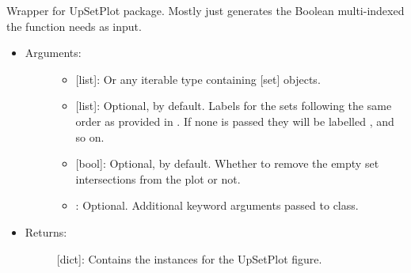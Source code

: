 \documentclass[letterpaper,10pt,english]{sphinxmanual}
\begin{document}
\begin{fulllineitems}
\label{\detokenize{plots:data_tools.plots.upset_wrap}}
Wrapper for UpSetPlot package. Mostly just generates the Boolean
multi-indexed  the  function
needs as input.
\begin{itemize}
\item {} \begin{description}
\item[{Arguments:}] \leavevmode\begin{itemize}
\item {} 
 {[}list{]}: Or any iterable type containing {[}set{]} objects.

\item {} 
 {[}list{]}: Optional,  by default. Labels for the
sets following the same order as provided in . If none is
passed they will be labelled ,  and so on.

\item {} 
 {[}bool{]}: Optional,  by default. Whether
to remove the empty set intersections from the plot or not.

\item {} 
: Optional. Additional keyword arguments passed to
 class.

\end{itemize}

\end{description}

\item {} \begin{description}
\item[{Returns:}] \leavevmode
{[}dict{]}: Contains the  instances for the
UpSetPlot figure.

\end{description}

\end{itemize}

\end{fulllineitems}
\end{document}
